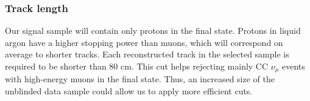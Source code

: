 \subsubsection{Track length}
Our signal sample will contain only protons in the final state. Protons in liquid argon have a higher stopping power than muons, which will correspond on average to shorter tracks. Each reconstructed track in the selected sample is required to be shorter than 80 cm. This cut helps rejecting mainly CC $\nu_{\mu}$ events with high-energy muons in the final state.
Thus, an increased size of the unblinded data sample could allow us to apply more efficient cuts.



